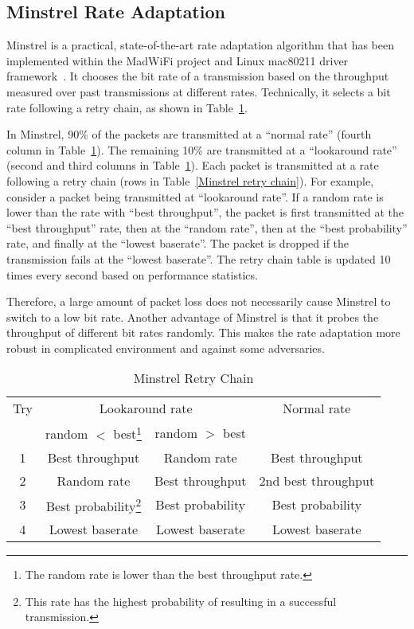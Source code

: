 \documentclass{IEEEtran}
\begin{document}
\subsection{Minstrel Rate Adaptation}
\label{Minstrel Rate Adaptation}
Minstrel is a practical, state-of-the-art rate adaptation algorithm that has been
implemented within the MadWiFi project and Linux mac80211
driver framework~\cite{Minstrel}. It chooses the bit rate of a
transmission based on the throughput measured over past transmissions at different rates. Technically, it
selects a bit rate following a retry chain, as shown in
Table~\ref{Minstrel retry chain}.


In Minstrel, 90\% of the packets are
transmitted at a ``normal rate'' (fourth column in Table~\ref{Minstrel retry chain}). The remaining 10\% are
transmitted at a ``lookaround rate'' (second and third columns in Table~\ref{Minstrel retry chain}). Each packet is transmitted at a
rate following a retry chain (rows in Table~\ref{Minstrel retry
  chain}). For example, consider a packet being transmitted at
``lookaround rate''. If a random rate is lower than the rate with ``best
throughput'', the packet is first transmitted at the
``best throughput'' rate, then at the ``random rate'', then at the ``best probability'' rate,
and finally at the ``lowest baserate''. The
packet is dropped if the transmission fails at the ``lowest
baserate''. The retry chain table is updated 10 times every second
based on performance statistics.

Therefore, a large amount of packet loss does not
necessarily cause Minstrel to switch to a low bit rate. Another advantage of
Minstrel is that it probes the throughput of different bit rates
randomly. This makes the rate adaptation more robust in complicated
environment and against some adversaries.


\begin{table}
\small
\centering
\caption{Minstrel Retry Chain \cite{Minstrel}}
\begin{tabular}{|c|c|c|c|} \hline \label{Minstrel retry chain}
Try & \multicolumn{2}{|c|}{Lookaround rate} & Normal rate \\
\cline{2-3}
    & random $<$ best\footnote{The random rate is lower than the best throughput rate.} & random $>$ best    & \\
\hline
1   & Best throughput  & Random rate      & Best throughput \\
\hline
2   & Random rate      & Best throughput  & 2nd best throughput \\
\hline
3   & Best probability\footnote{This rate has the highest probability of resulting in a successful transmission.} & Best probability & Best
probability \\
\hline
4   & Lowest baserate & Lowest baserate & Lowest baserate \\
\hline
\end{tabular}
\end{table}
\end{document}
